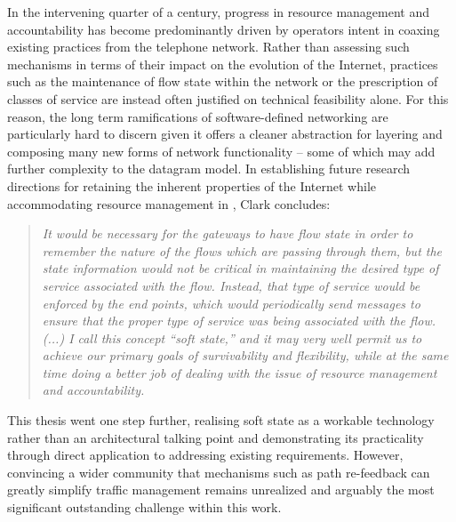 In the intervening quarter of a century, progress in resource management and accountability has become predominantly driven by operators intent in coaxing existing practices from the telephone network.
Rather than assessing such mechanisms in terms of their impact on the evolution of the Internet, practices such as the maintenance of flow state within the network or the prescription of classes of service are instead often justified on technical feasibility alone.
For this reason, the long term ramifications of software-defined networking are particularly hard to discern given it offers a cleaner abstraction for layering and composing many new forms of network functionality -- some of which may add further complexity to the datagram model.
In establishing future research directions for retaining the inherent properties of the Internet while accommodating resource management in \cite{Clark:1988p478}, Clark concludes:

\begin{quote}
\textit{
It would be necessary for the gateways to have flow state in order to remember the nature of the flows which are passing through them, but the state information would not be critical in maintaining the desired type of service associated with the flow. Instead, that type of service would be enforced by the end points, which would periodically send messages to ensure that the proper type of service was being associated with the flow.
(...)
I call this concept ``soft state,'' and it may very well permit us to achieve our primary goals of survivability and flexibility, while at the same time doing a better job of dealing with the issue of resource management and accountability.
}
\end{quote}

This thesis went one step further, realising soft state as a workable technology rather than an architectural talking point and demonstrating its practicality through direct application to addressing existing requirements.
However, convincing a wider community that mechanisms such as path re-feedback can greatly simplify traffic management remains unrealized and arguably the most significant outstanding challenge within this work.
